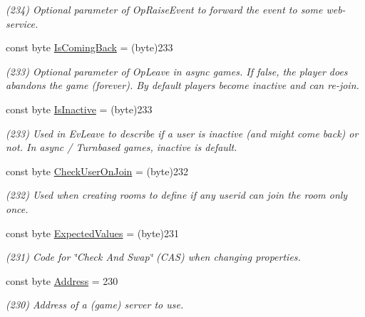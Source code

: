 \begin{DoxyCompactItemize}
\begin{DoxyCompactList}\small\item\em (234) Optional parameter of Op\+Raise\+Event to forward the event to some web-\/service.\end{DoxyCompactList}\item 
const byte \hyperlink{class_exit_games_1_1_client_1_1_photon_1_1_parameter_code_aafa0f3452290ec0f74bdb406580fe31a}{Is\+Coming\+Back} = (byte)233
\begin{DoxyCompactList}\small\item\em (233) Optional parameter of Op\+Leave in async games. If false, the player does abandons the game (forever). By default players become inactive and can re-\/join.\end{DoxyCompactList}\item 
const byte \hyperlink{class_exit_games_1_1_client_1_1_photon_1_1_parameter_code_add307b46f4a69da70ff2e917d9e36da6}{Is\+Inactive} = (byte)233
\begin{DoxyCompactList}\small\item\em (233) Used in Ev\+Leave to describe if a user is inactive (and might come back) or not. In async / Turnbased games, inactive is default.\end{DoxyCompactList}\item 
const byte \hyperlink{class_exit_games_1_1_client_1_1_photon_1_1_parameter_code_adfdc1774ad56abfc3aad08013ed26a56}{Check\+User\+On\+Join} = (byte)232
\begin{DoxyCompactList}\small\item\em (232) Used when creating rooms to define if any userid can join the room only once.\end{DoxyCompactList}\item 
const byte \hyperlink{class_exit_games_1_1_client_1_1_photon_1_1_parameter_code_aac4c8524d492e71f0f7285db64872860}{Expected\+Values} = (byte)231
\begin{DoxyCompactList}\small\item\em (231) Code for \char`\"{}\+Check And Swap\char`\"{} (C\+AS) when changing properties.\end{DoxyCompactList}\item 
const byte \hyperlink{class_exit_games_1_1_client_1_1_photon_1_1_parameter_code_acf4cf60ff38fc481c7b1a9becd0d42c5}{Address} = 230
\begin{DoxyCompactList}\small\item\em (230) Address of a (game) server to use.\end{DoxyCompactList}\item 

\end{DoxyCompactItemize}
